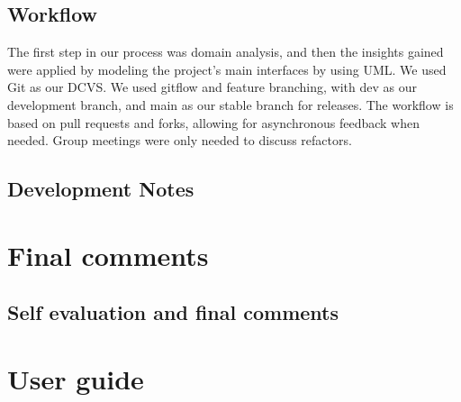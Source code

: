 \documentclass[a4paper,12pt]{report}
\begin{document}



\section{Workflow}
The first step in our process was domain analysis, and then the insights gained were applied by modeling 
the project's main interfaces by using UML.
We used Git as our DCVS. We used gitflow and feature branching, with dev as our development branch,
and main as our stable branch for releases. The workflow is based on pull requests and forks, allowing for asynchronous feedback when needed.
Group meetings were only needed to discuss refactors.





\section{Development Notes}




\chapter{Final comments}

\section{Self evaluation and final comments}




\appendix
\chapter{User guide}
\end{document}

